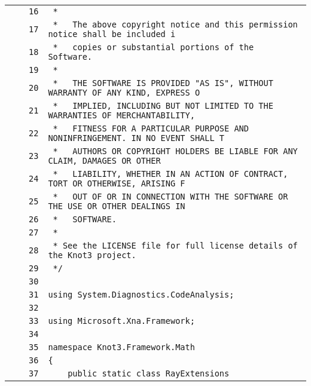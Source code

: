 \documentclass[a4paper,10pt]{article}
\begin{document}
\begin{longtable}[l]{lrrl}
\cellcolor{gray} &  & \verb~16~ & \verb~ *~\\
\cellcolor{gray} &  & \verb~17~ & \verb~ *   The above copyright notice and this permission notice shall be included i~\\
\cellcolor{gray} &  & \verb~18~ & \verb~ *   copies or substantial portions of the Software.~\\
\cellcolor{gray} &  & \verb~19~ & \verb~ *~\\
\cellcolor{gray} &  & \verb~20~ & \verb~ *   THE SOFTWARE IS PROVIDED "AS IS", WITHOUT WARRANTY OF ANY KIND, EXPRESS O~\\
\cellcolor{gray} &  & \verb~21~ & \verb~ *   IMPLIED, INCLUDING BUT NOT LIMITED TO THE WARRANTIES OF MERCHANTABILITY,~\\
\cellcolor{gray} &  & \verb~22~ & \verb~ *   FITNESS FOR A PARTICULAR PURPOSE AND NONINFRINGEMENT. IN NO EVENT SHALL T~\\
\cellcolor{gray} &  & \verb~23~ & \verb~ *   AUTHORS OR COPYRIGHT HOLDERS BE LIABLE FOR ANY CLAIM, DAMAGES OR OTHER~\\
\cellcolor{gray} &  & \verb~24~ & \verb~ *   LIABILITY, WHETHER IN AN ACTION OF CONTRACT, TORT OR OTHERWISE, ARISING F~\\
\cellcolor{gray} &  & \verb~25~ & \verb~ *   OUT OF OR IN CONNECTION WITH THE SOFTWARE OR THE USE OR OTHER DEALINGS IN~\\
\cellcolor{gray} &  & \verb~26~ & \verb~ *   SOFTWARE.~\\
\cellcolor{gray} &  & \verb~27~ & \verb~ *~\\
\cellcolor{gray} &  & \verb~28~ & \verb~ * See the LICENSE file for full license details of the Knot3 project.~\\
\cellcolor{gray} &  & \verb~29~ & \verb~ */~\\
\cellcolor{gray} &  & \verb~30~ & \verb~~\\
\cellcolor{gray} &  & \verb~31~ & \verb~using System.Diagnostics.CodeAnalysis;~\\
\cellcolor{gray} &  & \verb~32~ & \verb~~\\
\cellcolor{gray} &  & \verb~33~ & \verb~using Microsoft.Xna.Framework;~\\
\cellcolor{gray} &  & \verb~34~ & \verb~~\\
\cellcolor{gray} &  & \verb~35~ & \verb~namespace Knot3.Framework.Math~\\
\cellcolor{gray} &  & \verb~36~ & \verb~{~\\
\cellcolor{gray} &  & \verb~37~ & \verb~    public static class RayExtensions~\\

\end{longtable}
\end{document}
